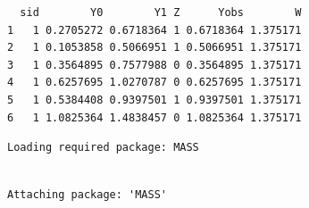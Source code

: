 \documentclass[
  letterpaper,
  DIV=11,
  numbers=noendperiod]{scrreprt}
\newenvironment{Shaded}{\begin{snugshade}}{\end{snugshade}}
\newcommand{\AttributeTok}[1]{\textcolor[rgb]{0.49,0.56,0.16}{#1}}
\newcommand{\DecValTok}[1]{\textcolor[rgb]{0.25,0.63,0.44}{#1}}
\newcommand{\FunctionTok}[1]{\textcolor[rgb]{0.02,0.16,0.49}{#1}}
\newcommand{\NormalTok}[1]{\textcolor[rgb]{0.00,0.44,0.13}{#1}}
\newcommand{\OtherTok}[1]{\textcolor[rgb]{0.00,0.44,0.13}{#1}}
\newcommand{\SpecialCharTok}[1]{\textcolor[rgb]{0.25,0.44,0.63}{#1}}
\begin{document}
\begin{verbatim}
  sid        Y0        Y1 Z      Yobs        W
1   1 0.2705272 0.6718364 1 0.6718364 1.375171
2   1 0.1053858 0.5066951 1 0.5066951 1.375171
3   1 0.3564895 0.7577988 0 0.3564895 1.375171
4   1 0.6257695 1.0270787 0 0.6257695 1.375171
5   1 0.5384408 0.9397501 1 0.9397501 1.375171
6   1 1.0825364 1.4838457 0 1.0825364 1.375171
\end{verbatim}

\begin{Shaded}
\end{Shaded}

\begin{verbatim}
Loading required package: MASS
\end{verbatim}

\begin{verbatim}

Attaching package: 'MASS'
\end{verbatim}
\end{document}
